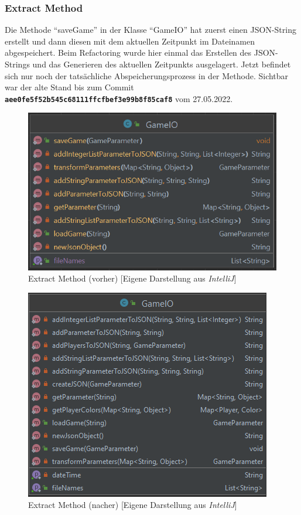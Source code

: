 \subsubsection{Extract Method}
\noindent Die Methode \enquote{saveGame} in der Klasse \enquote{GameIO} hat zuerst einen JSON-String erstellt und dann diesen mit dem aktuellen Zeitpunkt im Dateinamen abgespeichert. Beim Refactoring wurde hier einmal das Erstellen des JSON-Strings und das Generieren des aktuellen Zeitpunkts ausgelagert. Jetzt befindet sich nur noch der tatsächliche Abspeicherungsprozess in der Methode. Sichtbar war der alte Stand bis zum Commit \textbf{\texttt{aee0fe5f52b545c68111ffcfbef3e99b8f85caf8}} vom 27.05.2022.

\begin{figure}[htbp]
\centering
\centerline{\includegraphics[scale=.45]{gameio1}}
\caption{Extract Method (vorher) [Eigene Darstellung aus \emph{IntelliJ}]}
\label{fig:gameio1}
\end{figure}

\begin{figure}[htbp]
\centering
\centerline{\includegraphics[scale=.5]{gameio2}}
\caption{Extract Method (nacher) [Eigene Darstellung aus \emph{IntelliJ}]}
\label{fig:gameio2}
\end{figure}

